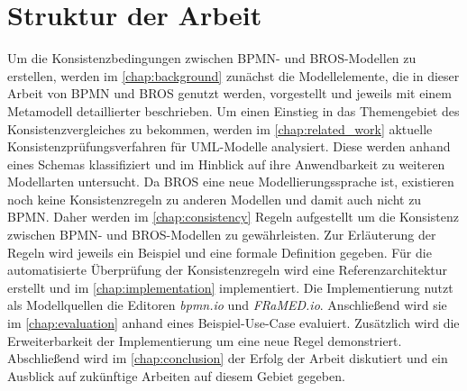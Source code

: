 \section{Struktur der Arbeit}

Um die Konsistenzbedingungen zwischen BPMN- und BROS-Modellen zu erstellen, werden im \cref{chap:background} zunächst die Modellelemente, die in dieser Arbeit von BPMN und BROS genutzt werden, vorgestellt und jeweils mit einem Metamodell detaillierter beschrieben.
Um einen Einstieg in das Themengebiet des Konsistenzvergleiches zu bekommen, werden im \cref{chap:related_work} aktuelle Konsistenzprüfungsverfahren für UML-Modelle analysiert.
Diese werden anhand eines Schemas klassifiziert und im Hinblick auf ihre Anwendbarkeit zu weiteren Modellarten untersucht.
Da BROS eine neue Modellierungssprache ist, existieren noch keine Konsistenzregeln zu anderen Modellen und damit auch nicht zu BPMN.
Daher werden im \cref{chap:consistency} Regeln aufgestellt um die Konsistenz zwischen BPMN- und BROS-Modellen zu gewährleisten.
Zur Erläuterung der Regeln wird jeweils ein Beispiel und eine formale Definition gegeben.
Für die automatisierte Überprüfung der Konsistenzregeln wird eine Referenzarchitektur erstellt und im \cref{chap:implementation} implementiert.
Die Implementierung nutzt als Modellquellen die Editoren \emph{bpmn.io} und \emph{FRaMED.io}.
Anschließend wird sie im \cref{chap:evaluation} anhand eines Beispiel-Use-Case evaluiert.
Zusätzlich wird die Erweiterbarkeit der Implementierung um eine neue Regel demonstriert.
Abschließend wird im \cref{chap:conclusion} der Erfolg der Arbeit diskutiert und ein Ausblick auf zukünftige Arbeiten auf diesem Gebiet gegeben.
